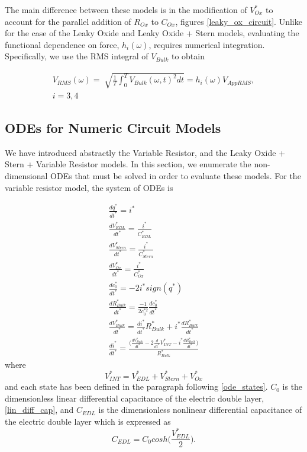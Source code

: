 The main difference between these models is in the modification of $V_{Ox}^*$ to account for the parallel addition of $R_{Ox}$ to $C_{Ox}$, figures \ref{leaky_ox_circuit}. Unlike for the case of the Leaky Oxide and Leaky Oxide + Stern models, evaluating the functional dependence on force, $h_i(\omega)$, requires numerical integration. Specifically, we use the RMS integral of $V_{Bulk}$ to obtain

\begin{align} \label{numeric_vrms}
V_{RMS}(\omega) = \sqrt[]{\frac{1}{T} \int_{0}^{T}V_{Bulk}(\omega,t)^2dt} = h_i(\omega)V_{AppRMS},\nonumber\\ i = 3,4
\end{align}

\subsection{ODEs for Numeric Circuit Models}
We have introduced abstractly the Variable Resistor, and the Leaky Oxide + Stern + Variable Resistor models. In this section, we enumerate the non-dimensional ODEs that must be solved in order to evaluate these models. For the variable resistor model, the system of ODEs is

\begin{align}
\frac{dq^*}{dt^*} = i^* \label{charge_state} \\
\frac{dV^*_{EDL}}{dt^*} = \frac{i^*}{C_{EDL}^*} \label{vedl_state} \\%
\frac{dV^*_{Stern}}{dt^*} = \frac{i^*}{C_{Stern}^*} \label{vstern_state} \\%
\frac{dV^*_{Ox}}{dt^*} = \frac{i^*}{C_{Ox}^*} \label{vox_state} \\
\frac{dc^*_0}{dt^*} = -2i^*sign(q^*) \label{concentration_state}\\
\frac{dR^*_{Bulk}}{dt^*} = \frac{-1}{2c_{0}^{*2}}\frac{dc^*_0}{dt^*} \label{resistor_state}\\
\frac{dV^*_{Bulk}}{dt^*} = \frac{di^*}{dt^*}R^*_{Bulk} + i^*\frac{dR^*_{Bulk}}{dt^*}\label{vbulk_state}  \\ 
\frac{di^*}{dt^*} = \frac{\bigg(\frac{dV^*_{Bulk}}{dt^*}-2\frac{d}{dt^*}V^*_{INT}-i^*\frac{dR^*_{Bulk}}{dt^*}\bigg)}{R^*_{Bulk}} \label{current_state} 
\end{align}
where 
\begin{equation}
    V^*_{INT}  = V^*_{EDL}+V^*_{Stern}+V^*_{Ox}   
\end{equation}
 and each state has been defined in the paragraph following \ref{ode_states}. $C_0$ is the dimensionless linear differential capacitance of the electric double layer, \ref{lin_diff_cap}, and $C_{EDL}$ is the dimensionless nonlinear differential capacitance of the electric double layer which is expressed as
\begin{equation} \label{edl_nonlinear}
C_{EDL} = C_{0} cosh\bigg(\frac{V^*_{EDL}}{2}\bigg).
\end{equation}

